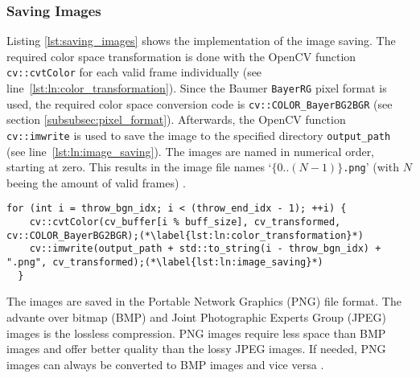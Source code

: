 \subsubsection{Saving Images}
\label{subsubsec:saving_images}

Listing \ref{lst:saving_images} shows the implementation of the image saving.
The required color space transformation is done with the OpenCV function \texttt{cv::cvtColor} for each valid frame individually (see line~\ref{lst:ln:color_transformation}).
Since the Baumer \texttt{BayerRG} pixel format is used, the required color space conversion code is \texttt{cv::COLOR\_BayerBG2BGR} (see section \ref{subsubsec:pixel_format}).
Afterwards, the OpenCV function \texttt{cv::imwrite} is used to save the image to the specified directory \texttt{output\_path} (see line~\ref{lst:ln:image_saving}).
The images are named in numerical order, starting at zero.
This results in the image file names `\texttt{$\{0..(N-1)\}$.png}' (with $N$ beeing the amount of valid frames) \cite{baumer_opencv}.

\vspace{5pt}
\begin{lstlisting}[style=C++, caption={Saving the images}, label=lst:saving_images]
  for (int i = throw_bgn_idx; i < (throw_end_idx - 1); ++i) {
    cv::cvtColor(cv_buffer[i % buff_size], cv_transformed, cv::COLOR_BayerBG2BGR);(*\label{lst:ln:color_transformation}*)
    cv::imwrite(output_path + std::to_string(i - throw_bgn_idx) + ".png", cv_transformed);(*\label{lst:ln:image_saving}*)
  }
\end{lstlisting}

The images are saved in the Portable Network Graphics (PNG) file format.
The advante over bitmap (BMP) and Joint Photographic Experts Group (JPEG) images is the lossless compression.
PNG images require less space than BMP images and offer better quality than the lossy JPEG images.
If needed, PNG images can always be converted to BMP images and vice versa \cite{image_formats}.
